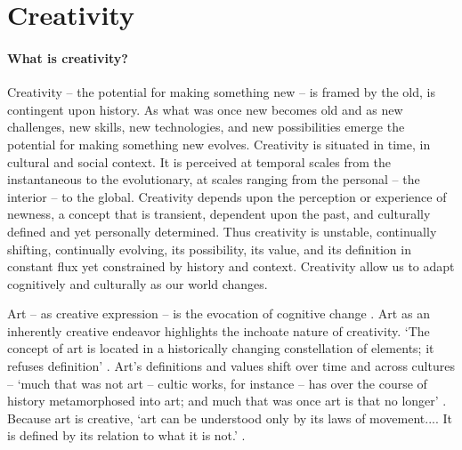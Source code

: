 \documentclass{article}
\begin{document}

\section{Creativity}

\paragraph{What is creativity?}
Creativity -- the potential for making something new -- 
is framed by the old, 
is contingent upon history.
As what was once new becomes old and 
as new challenges, new skills, new technologies, and new possibilities emerge 
the potential for making something new evolves.
%
Creativity is situated in time, in cultural and social context. 
It is perceived at temporal scales from the instantaneous to the evolutionary,
at scales ranging from the personal -- the interior -- to the global. 
%
Creativity depends upon the perception or experience of newness, 
a concept that is transient, dependent upon the past, and culturally defined and yet personally determined.
Thus creativity is unstable, continually shifting, continually evolving, 
its possibility, its value, and its definition in constant flux 
yet constrained by history and context.
Creativity allow us to adapt cognitively and culturally
as our world changes.


Art -- as creative expression -- is the evocation of cognitive change \citep{Donald2006}.
Art as an inherently creative endeavor
highlights the inchoate nature of creativity.
`The concept of art is located in a historically changing constellation of elements; it refuses definition'
\citep{Adorno1997}.
Art's definitions and values shift over time and across cultures -- 
`much that was not art -- cultic works, for instance -- has over the course of history metamorphosed into art; 
and much that was once art is that no longer'
\citep{Adorno1997}.
Because art is creative, 
`art can be understood only by its laws of movement.... It is defined by its relation to what it is not.'
\citep{Adorno1997}.
%

\end{document}
